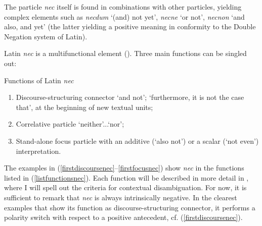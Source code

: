 \documentclass[output=paper]{langsci/langscibook}
\begin{document}
\noindent The particle {\emph{nec}} itself is found in combinations with other particles, yielding complex elements such as {\emph{necdum}} `(and) not yet', {\emph{necne}} `or not', {\emph{necnon}} `and also, and yet' (the latter yielding a positive meaning in conformity to the Double Negation system of Latin).

Latin {\emph{nec}} is a multifunctional element (\citealt[]{Orlandini01, OrlandiniPoccetti07}). Three main functions can be singled out:

\begin{exe}
\ex \label{listfunctionsnec} Functions of Latin {\emph{nec}}
\begin{enumerate}[label=(\roman*)]
\item  Discourse-structuring connector `and not'; `furthermore, it is not the case that', at the beginning of new textual units;
\item  Correlative particle `neither'...`nor';
\item  Stand-alone focus particle with an additive (`also not') or a scalar (`not even') interpretation.
\end{enumerate}
\end{exe}

\noindent The examples in (\ref{firstdiscoursenec}--\ref{firstfocusnec}) show {\emph{nec}} in the functions listed in (\ref{listfunctionsnec}). Each function will be described in more detail in , where I will spell out the criteria for contextual disambiguation. For now, it is sufficient to remark that {\emph{nec}} is always intrinsically negative. In the clearest examples that show its function as discourse-structuring connector, it performs a polarity switch with respect to a positive antecedent, cf. (\ref{firstdiscoursenec}).
\end{document}
